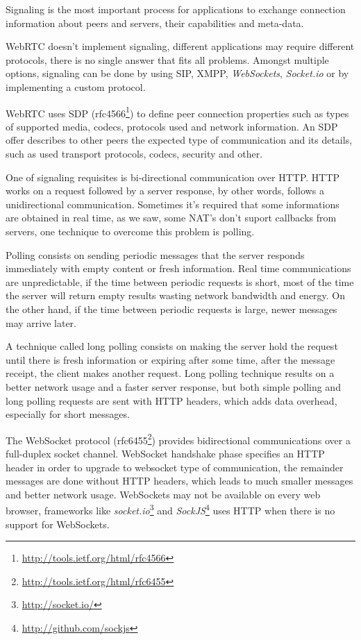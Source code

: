 
  Signaling is the most important process for applications to exchange connection information about peers and servers, their capabilities and meta-data.

  \ac{WebRTC} doesn't implement signaling, different applications may require different protocols, there is no single answer that fits all problems. Amongst multiple options, signaling can be done by using \ac{SIP}, \ac{XMPP}, \textit{WebSockets}, \textit{Socket.io} or by implementing a custom protocol.

  \ac{WebRTC} uses \ac{SDP} (rfc4566\footnote{\url{http://tools.ietf.org/html/rfc4566}}) to define peer connection properties such as types of supported media, codecs, protocols used and network information. An \ac{SDP} offer describes to other peers the expected type of communication and its details, such as used transport protocols, codecs, security and other.

  One of signaling requisites is bi-directional communication over \ac{HTTP}. \ac{HTTP} works on a request followed by a server response, by other words, follows a unidirectional communication. Sometimes it's required that some informations are obtained in real time, as we saw, some \ac{NAT}'s don't suport callbacks from servers, one technique to overcome this problem is polling.

  Polling consists on sending periodic messages that the server responds immediately with empty content or fresh information. Real time communications are unpredictable, if the time between periodic requests is short, most of the time the server will return empty results wasting network bandwidth and energy. On the other hand, if the time between periodic requests is large, newer messages may arrive later.

  A technique called long polling consists on making the server hold the request until there is fresh information or expiring after some time, after the message receipt, the client makes another request. Long polling technique results on a better network usage and a faster server response, but both simple polling and long polling requests are sent with \ac{HTTP} headers, which adds data overhead, especially for short messages.

  The WebSocket protocol (rfc6455\footnote{\url{http://tools.ietf.org/html/rfc6455}}) provides bidirectional communications over a full-duplex socket channel. WebSocket handshake phase specifies an \ac{HTTP} header in order to upgrade to websocket type of communication, the remainder messages are done without \ac{HTTP} headers, which leads to much smaller messages and better network usage. WebSockets may not be available on every web browser, frameworks like \textit{socket.io}\footnote{\url{http://socket.io/}} and \textit{SockJS}\footnote{\url{http://github.com/sockjs}} uses \ac{HTTP} when there is no support for WebSockets. 

